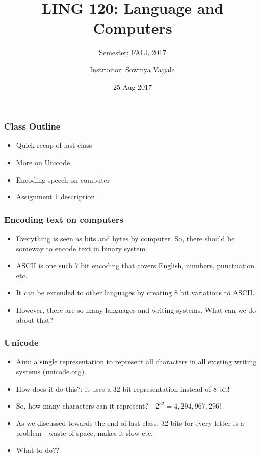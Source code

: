 \documentclass{beamer}
\author[Sowmya Vajjala]{Instructor: Sowmya Vajjala}
\title[LING 120]{LING 120: Language and Computers}
\subtitle{Semester: FALL 2017}
\date{25 Aug 2017}
\institute{Iowa State University, USA}
\begin{document}
\begin{frame}\titlepage
\end{frame}

\begin{frame}
\frametitle{Class Outline}
\begin{itemize}
\item Quick recap of last class %
\item More on Unicode
\item Encoding speech on computer %
\item Assignment 1 description %
\end{itemize}
\end{frame}

\begin{frame}
\frametitle{Encoding text on computers}
\begin{itemize}
\item Everything is seen as bits and bytes by computer. So, there should be someway to encode text in binary system.
\pause \item ASCII is one such 7 bit encoding that covers English, numbers, punctuation etc.
\item It can be extended to other languages by creating 8 bit variations to ASCII.
\item However, there are so many languages and writing systems. What can we do about that? 
\end{itemize}
\end{frame}

\begin{frame}
\frametitle{Unicode}
\begin{itemize}
\item Aim: a single representation to represent all characters in all existing writing systems (\url{unicode.org}). \pause
\item How does it do this?: it uses a 32 bit representation instead of 8 bit!
\item So, how many characters can it represent? -  $2^{32} = 4,294,967,296$! \pause
\item As we discussed towards the end of last class, 32 bits for every letter is a problem - waste of space, makes it slow etc. 
\item What to do??
\end{itemize}
\end{frame}
\end{document}
